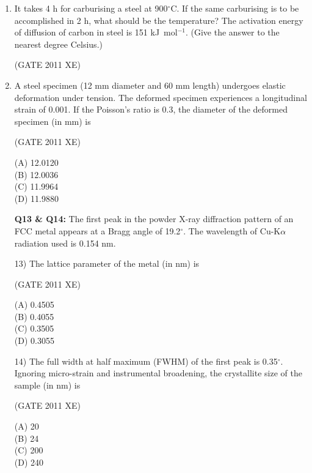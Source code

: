 \documentclass[journal,12pt,onecolumn]{IEEEtran}
\begin{document}
\begin{enumerate}
\begin{enumerate}
\begin{enumerate}
\item It takes 4 h for carburising a steel at 900$^\circ$C. If the same carburising is to be accomplished in 2 h, what should be the temperature? The activation energy of diffusion of carbon in steel is 151 kJ~mol$^{-1}$.
(Give the answer to the nearest degree Celsius.)

\hfill{(GATE 2011 XE)}\\


\item A steel specimen (12 mm diameter and 60 mm length) undergoes elastic deformation under tension. The deformed specimen experiences a longitudinal strain of 0.001. If the Poisson's ratio is 0.3, the diameter of the deformed specimen (in mm) is

\hfill{(GATE 2011 XE)}\\
\begin{multicols}{4}
(A) 12.0120 \\
(B) 12.0036 \\
(C) 11.9964 \\
(D) 11.9880
\end{multicols}

\newpage

\item[\textbf{Q13 \& Q14:}] The first peak in the powder X-ray diffraction pattern of an FCC metal appears at a Bragg angle of 19.2$^{\circ}$. The wavelength of Cu-K$\alpha$ radiation used is 0.154 nm.

\item[13)] The lattice parameter of the metal (in nm) is

\hfill{(GATE 2011 XE)}\\
\begin{multicols}{4}
(A) 0.4505 \\
(B) 0.4055 \\
(C) 0.3505 \\
(D) 0.3055
\end{multicols}

\item[14)] The full width at half maximum (FWHM) of the first peak is 0.35$^{\circ}$. Ignoring micro-strain and instrumental broadening, the crystallite size of the sample (in nm) is

\hfill{(GATE 2011 XE)}\\
\begin{multicols}{4}
(A) 20 \\
(B) 24 \\
(C) 200 \\
(D) 240
\end{multicols}


\end{enumerate}
\end{enumerate}
\end{enumerate}
\end{document}
